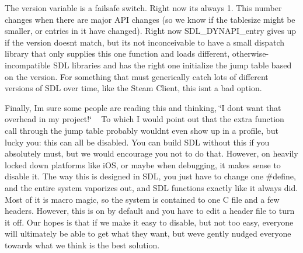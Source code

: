 The version variable is a failsafe switch. Right now it\textquotesingle{}s always 1. This number changes when there are major A\+PI changes (so we know if the tablesize might be smaller, or entries in it have changed). Right now S\+D\+L\+\_\+\+D\+Y\+N\+A\+P\+I\+\_\+entry gives up if the version doesn\textquotesingle{}t match, but it\textquotesingle{}s not inconceivable to have a small dispatch library that only supplies this one function and loads different, otherwise-\/incompatible S\+DL libraries and has the right one initialize the jump table based on the version. For something that must generically catch lots of different versions of S\+DL over time, like the Steam Client, this isn\textquotesingle{}t a bad option.

Finally, I\textquotesingle{}m sure some people are reading this and thinking, \char`\"{}\+I don\textquotesingle{}t want that overhead in my project!\char`\"{} ~\newline
To which I would point out that the extra function call through the jump table probably wouldn\textquotesingle{}t even show up in a profile, but lucky you\+: this can all be disabled. You can build S\+DL without this if you absolutely must, but we would encourage you not to do that. However, on heavily locked down platforms like i\+OS, or maybe when debugging, it makes sense to disable it. The way this is designed in S\+DL, you just have to change one \#define, and the entire system vaporizes out, and S\+DL functions exactly like it always did. Most of it is macro magic, so the system is contained to one C file and a few headers. However, this is on by default and you have to edit a header file to turn it off. Our hopes is that if we make it easy to disable, but not too easy, everyone will ultimately be able to get what they want, but we\textquotesingle{}ve gently nudged everyone towards what we think is the best solution. 
